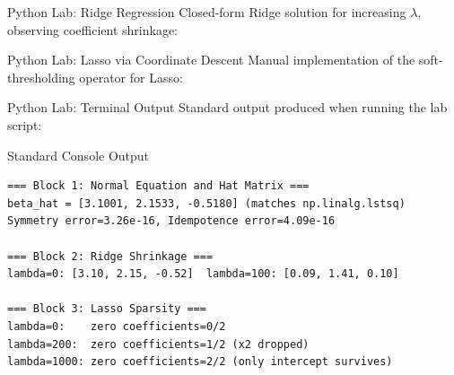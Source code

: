 \documentclass[10pt, aspectratio=169]{beamer}
\begin{document}
\begin{frame}[fragile]{Python Lab: Ridge Regression}
  \scriptsize
  Closed-form Ridge solution for increasing $\lambda$, observing coefficient shrinkage:
  {
  }
\end{frame}

\begin{frame}[fragile]{Python Lab: Lasso via Coordinate Descent}
  \scriptsize
  Manual implementation of the soft-thresholding operator for Lasso:
  {
  }
\end{frame}

\begin{frame}[fragile]{Python Lab: Terminal Output}
  \scriptsize
  Standard output produced when running the lab script:
  \vspace{0.02cm}
  \begin{block}{Standard Console Output}
    \fontsize{3.6pt}{4.3pt}\selectfont
    \begin{verbatim}
=== Block 1: Normal Equation and Hat Matrix ===
beta_hat = [3.1001, 2.1533, -0.5180] (matches np.linalg.lstsq)
Symmetry error=3.26e-16, Idempotence error=4.09e-16

=== Block 2: Ridge Shrinkage ===
lambda=0: [3.10, 2.15, -0.52]  lambda=100: [0.09, 1.41, 0.10]

=== Block 3: Lasso Sparsity ===
lambda=0:    zero coefficients=0/2
lambda=200:  zero coefficients=1/2 (x2 dropped)
lambda=1000: zero coefficients=2/2 (only intercept survives)
    \end{verbatim}
  \end{block}
\end{frame}
\end{document}
